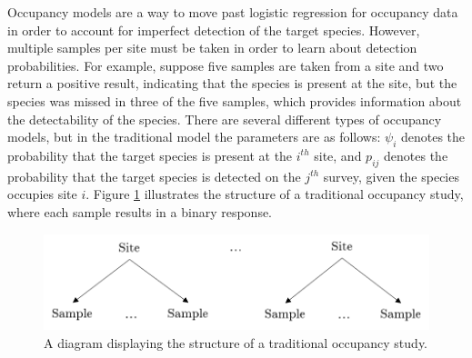 \documentclass[12pt]{article}\usepackage[]{graphicx}\usepackage[]{color}
\begin{document}
Occupancy models are a way to move past logistic regression for occupancy data in order to account for imperfect detection of the target species. However, multiple samples per site must be taken in order to learn about detection probabilities. For example, suppose five samples are taken from a site and two return a positive result, indicating that the species is present at the site, but the species was missed in three of the five samples, which provides information about the detectability of the species. There are several different types of occupancy models, but in the traditional model the parameters are as follows: $\psi_i$ denotes the probability that the target species is present at the $i^{th}$ site, and $p_{ij}$ denotes the probability that the target species is detected on the $j^{th}$ survey, given the species occupies site $i$. Figure \ref{fig:ssocc} illustrates the structure of a traditional occupancy study, where each sample results in a binary response. 

\begin{figure}[]
	\centering
	\includegraphics[scale = 0.7]{ssocc}
	\caption{A diagram displaying the structure of a traditional occupancy study.}
	\label{fig:ssocc}
\end{figure}
\end{document}
